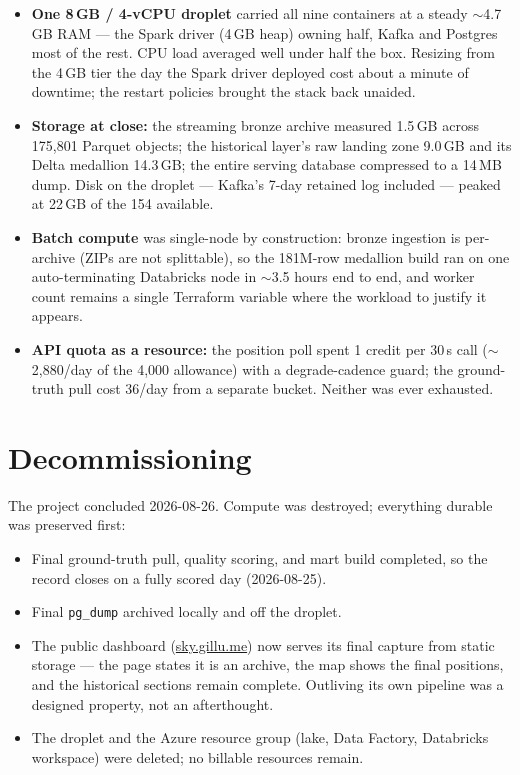 \documentclass[11pt]{article}
\newcommand{\code}[1]{\texttt{\small #1}}
\begin{document}
\begin{itemize}
\item \textbf{One 8\,GB / 4-vCPU droplet} carried all nine containers at a
steady ${\sim}$4.7\,GB RAM --- the Spark driver (4\,GB heap) owning half,
Kafka and Postgres most of the rest. CPU load averaged well under half the
box. Resizing from the 4\,GB tier the day the Spark driver deployed cost
about a minute of downtime; the restart policies brought the stack back
unaided.
\item \textbf{Storage at close:} the streaming bronze archive measured
1.5\,GB across 175{,}801 Parquet objects; the historical layer's raw
landing zone 9.0\,GB and its Delta medallion 14.3\,GB; the entire serving
database compressed to a 14\,MB dump. Disk on the droplet --- Kafka's
7-day retained log included --- peaked at 22\,GB of the 154 available.
\item \textbf{Batch compute} was single-node by construction: bronze
ingestion is per-archive (ZIPs are not splittable), so the 181M-row
medallion build ran on one auto-terminating Databricks node in
${\sim}$3.5 hours end to end, and worker count remains a single Terraform
variable where the workload to justify it appears.
\item \textbf{API quota as a resource:} the position poll spent 1 credit
per 30\,s call (${\sim}$2{,}880/day of the 4{,}000 allowance) with a
degrade-cadence guard; the ground-truth pull cost 36/day from a separate
bucket. Neither was ever exhausted.
\end{itemize}

\section{Decommissioning}

The project concluded 2026-08-26. Compute was destroyed; everything durable
was preserved first:

\begin{itemize}
\item Final ground-truth pull, quality scoring, and mart build completed,
so the record closes on a fully scored day (2026-08-25).
\item Final \code{pg\_dump} archived locally and off the droplet.
\item The public dashboard (\href{https://sky.gillu.me}{sky.gillu.me})
now serves its final capture from static storage --- the page states it is
an archive, the map shows the final positions, and the historical sections
remain complete. Outliving its own pipeline was a designed property, not an
afterthought.
\item The droplet and the Azure resource group (lake, Data Factory,
Databricks workspace) were deleted; no billable resources remain.
\end{itemize}
\end{document}
